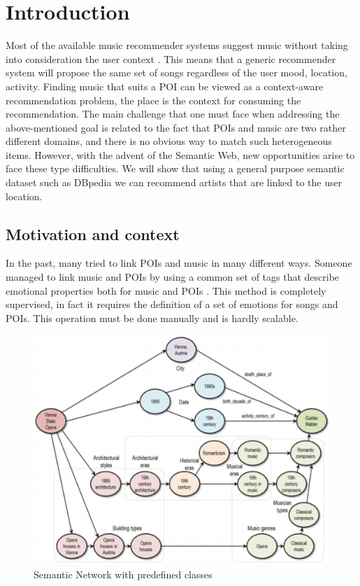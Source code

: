 \documentclass[paper=a4, fontsize=11pt]{scrartcl}
\begin{document}
\tableofcontents
\newpage

\section{Introduction}
Most of the available music recommender systems suggest music without taking into consideration the user context \cite{Knees:2013:SMS:2559928.2542206}. This means that a generic recommender system will propose the same set of songs regardless of the user mood, location, activity.
Finding music that suits a POI can be viewed as a context-aware recommendation problem, the place is the context for consuming the recommendation.                    
The main challenge that one must face when addressing the above-mentioned goal is related to the fact that POIs and music are two rather different domains, and there is no obvious way to match such heterogeneous items. However, with the advent of the Semantic Web, new opportunities arise to face these type difficulties. We will show that using a general purpose semantic dataset such as DBpedia we can recommend artists that are linked to the user location.

\subsection{Motivation and context}
In the past, many tried to link POIs and music in many different ways. Someone managed to link music and POIs by using a common set of tags that describe emotional properties both for music and POIs \cite{Kaminskas:2013:LMR:2507157.2507180}. This method is completely supervised, in fact it requires the definition of a set of emotions for songs and POIs. This operation must be done manually and is hardly scalable.
\begin{figure}[!htb]
  \centering 
    \includegraphics[width=1\textwidth]{images/semantic_net.png}
    \caption{Semantic Network with predefined classes}
\end{figure}
\end{document}
